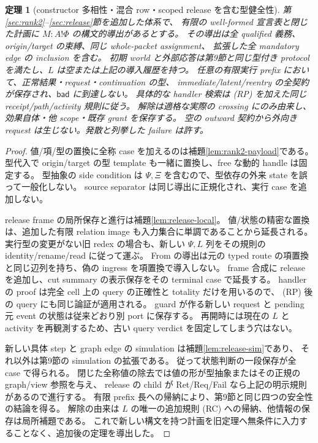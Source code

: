 \documentclass[11pt,a4paper]{article}
\newtheorem{theorem}[definition]{定理}
\newcommand{\Bad}{\mathsf{bad}}
\begin{document}
\begin{theorem}[constructor 多相性・混合 row・scoped release を含む型健全性]
\label{thm:extended-safety}
第\ref{sec:rank2}--\ref{sec:release}節を追加した体系で、
有限の well-formed 宣言表と閉じた計画に \(M:A!\Phi\) の構文的導出があるとする。
その導出は全 qualified 義務、origin/target の束縛、同じ whole-packet assignment、
拡張した全 mandatory edge の inclusion を含む。
初期 world と外部応答は第9節と同じ型付き protocol を満たし、\(L\) は空または上記の導入履歴を持つ。
任意の有限実行 prefix において、正常結果・request・continuation の型、
immediate/latent/reentry の全契約が保存され、\(\Bad\) に到達しない。
具体的な handler 検索は (RP) を加えた同じ receipt/path/activity 規則に従う。
解除は適格な実際の crossing にのみ由来し、効果自体・他 scope・既存 grant を保存する。
空の outward 契約から外向き request は生じない。発散と列挙した failure は許す。
\end{theorem}
\begin{proof}
値/項/型の置換に全称 case を加えるのは補題\ref{lem:rank2-payload}である。
型代入で origin/target の型 template も一緒に置換し、free な動的 handle は固定する。
型抽象の side condition は \(\Psi,\Xi\) を含むので、型依存の外来 state を誤って一般化しない。
source separator は同じ導出に正規化され、実行 case を追加しない。

release frame の局所保存と進行は補題\ref{lem:release-local}。
値/状態の精密な置換は、追加した有限 relation image も入力集合に単調であることから延長される。
実行型の変更がない旧 redex の場合も、新しい \(\Psi,L\) 列をその規則の identity/rename/read に従って運ぶ。
From の導出は元の typed route の項置換と同じ辺列を持ち、偽の ingress を項置換で導入しない。
frame 合成に release を追加し、cut summary の表示保存をその terminal case で延長する。
handler の proof は完全 cell 上の query の正確性と totality だけを用いるので、
(RP) 後の query にも同じ論証が適用される。
guard が作る新しい request と pending 元 event の状態は従来どおり別 port に保存する。
再開時には現在の \(L\) と activity を再観測するため、古い query verdict を固定してしまう穴はない。

新しい具体 step と graph edge の simulation は補題\ref{lem:release-sim}であり、
それ以外は第9節の simulation の拡張である。
従って状態判断の一段保存が全 case で得られる。
閉じた全称値の除去では値の形が型抽象またはその正規の graph/view 参照を与え、
release の child が Ret/Req/Fail なら上記の明示規則があるので進行する。
有限 prefix 長への帰納により、第9節と同じ四つの安全性の結論を得る。
解除の由来は \(L\) の唯一の追加規則 (RC) への帰納、他情報の保存は局所補題である。
これで新しい構文を持つ計画を旧定理へ無条件に入力することなく、追加後の定理を導出した。
\end{proof}
\end{document}

